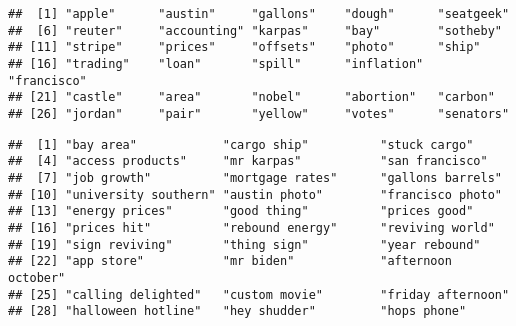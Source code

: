 \documentclass[
]{article}
\newenvironment{Shaded}{\begin{snugshade}}{\end{snugshade}}
\newcommand{\DecValTok}[1]{\textcolor[rgb]{0.00,0.00,0.81}{#1}}
\newcommand{\FunctionTok}[1]{\textcolor[rgb]{0.00,0.00,0.00}{#1}}
\newcommand{\NormalTok}[1]{#1}
\newcommand{\SpecialCharTok}[1]{\textcolor[rgb]{0.00,0.00,0.00}{#1}}
\begin{document}
\begin{Shaded}
\end{Shaded}

\begin{verbatim}
##  [1] "apple"      "austin"     "gallons"    "dough"      "seatgeek"  
##  [6] "reuter"     "accounting" "karpas"     "bay"        "sotheby"   
## [11] "stripe"     "prices"     "offsets"    "photo"      "ship"      
## [16] "trading"    "loan"       "spill"      "inflation"  "francisco" 
## [21] "castle"     "area"       "nobel"      "abortion"   "carbon"    
## [26] "jordan"     "pair"       "yellow"     "votes"      "senators"
\end{verbatim}

\begin{Shaded}
\end{Shaded}

\begin{verbatim}
##  [1] "bay area"            "cargo ship"          "stuck cargo"        
##  [4] "access products"     "mr karpas"           "san francisco"      
##  [7] "job growth"          "mortgage rates"      "gallons barrels"    
## [10] "university southern" "austin photo"        "francisco photo"    
## [13] "energy prices"       "good thing"          "prices good"        
## [16] "prices hit"          "rebound energy"      "reviving world"     
## [19] "sign reviving"       "thing sign"          "year rebound"       
## [22] "app store"           "mr biden"            "afternoon october"  
## [25] "calling delighted"   "custom movie"        "friday afternoon"   
## [28] "halloween hotline"   "hey shudder"         "hops phone"
\end{verbatim}
\end{document}
